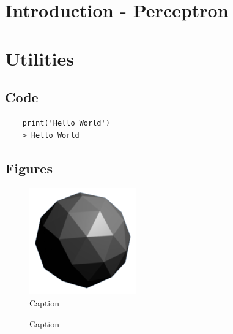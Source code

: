 \documentclass[a4paper]{scrartcl}
\title{\Title}
\date{\Date}
\author{\Author}
\subtitle{\Subtitle}
\theoremstyle{definition}
\begin{document}
\maketitle

\thispagestyle{fancy}

\tableofcontents
\clearpage

\section{Introduction - Perceptron}

\section{Utilities}

\subsection{Code}
\begin{verbatim}
	print('Hello World')
	> Hello World
\end{verbatim}

\subsection{Figures}
\begin{figure}[tbh]
	\centering
	\includegraphics[width=.3\linewidth]{figures/flat.png}
	\caption{\label{fig:demo-bad}
		Caption}
\end{figure}

\begin{figure}[tbh]
	\centering
	\caption{\label{fig:demo} 
		Caption}
\end{figure}
\end{document}
